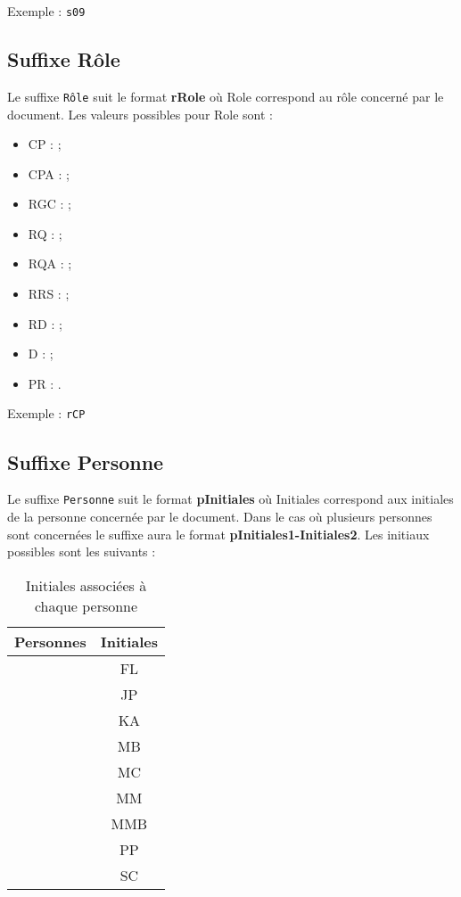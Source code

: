 Exemple : \verb+s09+

\subsection{Suffixe Rôle}
\label{suffixe_role}

Le suffixe \verb+Rôle+ suit le format \textbf{rRole} où Role correspond au rôle concerné par le document. Les valeurs possibles pour Role sont : 
\begin{itemize}
\item CP :  \CP;
\item CPA : \CPA;
\item RGC : \RGC;
\item RQ : \RQ;
\item RQA : \RQA;
\item RRS : \RRS;
\item RD : \RD;
\item D : \D;
\item PR : \PDR.\\
\end{itemize}

Exemple : \verb+rCP+

\subsection{Suffixe Personne}
\label{suffixe_personne}

Le suffixe \verb+Personne+ suit le format \textbf{pInitiales} où Initiales correspond aux initiales de la personne concernée par le document. Dans le cas où plusieurs personnes sont concernées le suffixe aura le format \textbf{pInitiales1-Initiales2}. Les initiaux possibles sont les suivants :
\begin{table}[H]
	\centering
	\begin{tabularx}{8cm}{|X|c|}
	\hline
	\rowcolor[gray]{0.85} Personnes & Initiales\\
	\hline
	\Florian & FL \\
	\hline
	\Julie & JP \\
	\hline
	\Kafui & KA \\
	\hline
	\Melissa & MB \\
	\hline
	\Michel & MC \\
	\hline
	\Mathieu & MM \\
	\hline
	\Matthieu & MMB \\
	\hline
	\Pierre & PP \\
	\hline
	\Sergi & SC \\
	\hline
	\end{tabularx}
	\caption{Initiales associées à chaque personne}
	\label{Initiales}
\end{table}

